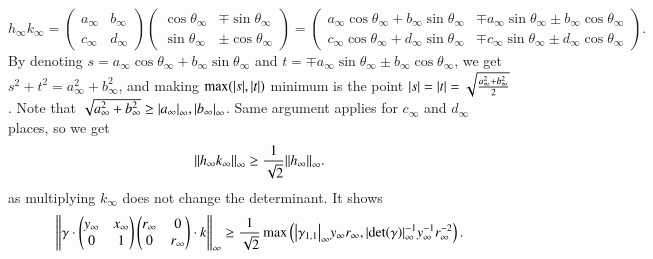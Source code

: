 \documentclass[a4paper, 12pt]{article}
\theoremstyle{Mydefinition}
\theoremstyle{Mytheorem}
\begin{document}
\begin{equation}
    h_\infty k_\infty = \begin{pmatrix}
    a_\infty & b_\infty\\
    c_\infty & d_\infty
    \end{pmatrix}\begin{pmatrix}
    \cos \theta_\infty & \mp\sin\theta_\infty\\
    \sin \theta_\infty & \pm\cos \theta_\infty
    \end{pmatrix}
    =\begin{pmatrix}
    a_\infty \cos\theta_\infty + b_\infty\sin\theta_\infty & \mp a_\infty\sin\theta_\infty \pm b_\infty \cos\theta_\infty \\
    c_\infty \cos\theta_\infty + d_\infty\sin\theta_\infty & \mp c_\infty\sin\theta_\infty \pm d_\infty \cos\theta_\infty
    \end{pmatrix}.
\end{equation}
By denoting $s = a_\infty \cos\theta_\infty + b_\infty\sin\theta_\infty$ and $t = \mp a_\infty\sin\theta_\infty \pm b_\infty \cos\theta_\infty$, we get $s^2+t^2 = a_\infty^2+b_\infty^2$, and making $\max(\abs{s},\abs{t})$ minimum is the point $\abs{s}=\abs{t}=\sqrt{\frac{a_\infty^2+b_\infty^2}{2}}$. Note that $\sqrt{a_\infty^2+b_\infty^2}\geq \abs{a_\infty}_\infty, \abs{b_\infty}_\infty$. Same argument applies for $c_\infty$ and $d_\infty$ places, so we get
\begin{equation}
    \norm{h_\infty k_\infty}_\infty \geq \frac{1}{\sqrt{2}}\norm{h_\infty}_\infty.
\end{equation}
as multiplying $k_\infty$ does not change the determinant. It shows
\begin{equation}
    \norm{\gamma\cdot\begin{pmatrix}y_\infty & x_\infty\\ 0 & 1
    \end{pmatrix}\begin{pmatrix}r_\infty & 0\\ 0 & r_\infty
    \end{pmatrix}\cdot k}_\infty \geq \frac{1}{\sqrt{2}}\max\left(\abs{\gamma_{1,1}}_\infty y_\infty r_\infty, \abs{\det(\gamma)}_\infty^{-1}y_\infty^{-1} r_\infty^{-2}\right).
\end{equation}
\end{document}
